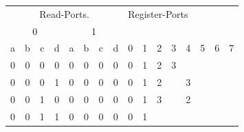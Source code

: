 \begin{table}[htbp]
	\begin{minipage}{\textwidth}
	\centering
	\begin{tabular}{cccccccccccccccc}
		\multicolumn{8}{c}{Read-Ports.}                 & \multicolumn{8}{|l}{Register-Ports}                                                               \\
		\multicolumn{4}{c}{0} & \multicolumn{4}{c}{1} & \multicolumn{1}{|c}{} & \multicolumn{1}{c}{} &
		\multicolumn{1}{c}{} &
		\multicolumn{1}{c}{} &
		\multicolumn{1}{c}{} &
		\multicolumn{1}{c}{} &
		\multicolumn{1}{c}{} &
		\multicolumn{1}{c}{}\\
		\multicolumn{1}{c}{a} & \multicolumn{1}{c}{b} & \multicolumn{1}{c}{c} & \multicolumn{1}{c}{d} &
		\multicolumn{1}{c}{a} & \multicolumn{1}{c}{b} & \multicolumn{1}{c}{c} & \multicolumn{1}{c}{d} &
		\multicolumn{1}{|c}{0} & \multicolumn{1}{c}{1} & \multicolumn{1}{c}{2}& \multicolumn{1}{c}{3} &
		\multicolumn{1}{c}{4} & \multicolumn{1}{c}{5} & \multicolumn{1}{c}{6}& \multicolumn{1}{c}{7} \\
		\hline
		\multicolumn{1}{c}{0} & \multicolumn{1}{c}{0} & \multicolumn{1}{c}{0} & \multicolumn{1}{c}{0} &
		\multicolumn{1}{c}{0} & \multicolumn{1}{c}{0} & \multicolumn{1}{c}{0} & \multicolumn{1}{c}{0} &
		\multicolumn{1}{|c}{0} & \multicolumn{1}{c}{1} & \multicolumn{1}{c}{2}& \multicolumn{1}{c}{3} &
		\multicolumn{1}{c}{} &
		\multicolumn{1}{c}{} &
		\multicolumn{1}{c}{}&
		\multicolumn{1}{c}{} \\
		\multicolumn{1}{c}{0} & \multicolumn{1}{c}{0} & \multicolumn{1}{c}{0} & \multicolumn{1}{c}{1} &
		\multicolumn{1}{c}{0} & \multicolumn{1}{c}{0} & \multicolumn{1}{c}{0} & \multicolumn{1}{c}{0} &
		\multicolumn{1}{|c}{0} & \multicolumn{1}{c}{1} & \multicolumn{1}{c}{2}&
		\multicolumn{1}{c}{} &
		\multicolumn{1}{c}{3} & \multicolumn{1}{c}{} &
		\multicolumn{1}{c}{}&
		\multicolumn{1}{c}{} \\
		\multicolumn{1}{c}{0} & \multicolumn{1}{c}{0} & \multicolumn{1}{c}{1} & \multicolumn{1}{c}{0} &
		\multicolumn{1}{c}{0} & \multicolumn{1}{c}{0} & \multicolumn{1}{c}{0} & \multicolumn{1}{c}{0} &
		\multicolumn{1}{|c}{0} & \multicolumn{1}{c}{1} & \multicolumn{1}{c}{3}&
		\multicolumn{1}{c}{} &
		\multicolumn{1}{c}{2} & \multicolumn{1}{c}{} &
		\multicolumn{1}{c}{}&
		\multicolumn{1}{c}{} \\
		\multicolumn{1}{c}{0} & \multicolumn{1}{c}{0} & \multicolumn{1}{c}{1} & \multicolumn{1}{c}{1} &
		\multicolumn{1}{c}{0} & \multicolumn{1}{c}{0} & \multicolumn{1}{c}{0} & \multicolumn{1}{c}{0} &
		\multicolumn{1}{|c}{0} & \multicolumn{1}{c}{1} & \multicolumn{1}{c}{}&

\end{tabular}
\end{minipage}
\end{table}
